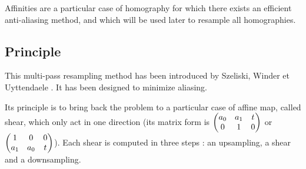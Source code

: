 

Affinities are a particular case of homography for which there exists an efficient anti-aliasing method, and which will be used later to resample all homographies.

\subsection{Principle}
	
	This multi-pass resampling method has been introduced by Szeliski, Winder et Uyttendaele \cite{szeliski2010high}. It has been designed to minimize aliasing.

	
	Its principle is to bring back the problem to a particular case of affine map, called shear, which only act in one direction (its matrix form is $\begin{pmatrix} a_0 & a_1 & t\\ 0 & 1 & 0 \end{pmatrix}$ or $\begin{pmatrix} 1 & 0 & 0\\ a_1 & a_0 & t \end{pmatrix}$). Each shear is computed in three steps : an upsampling, a shear and a downsampling.
	
	
